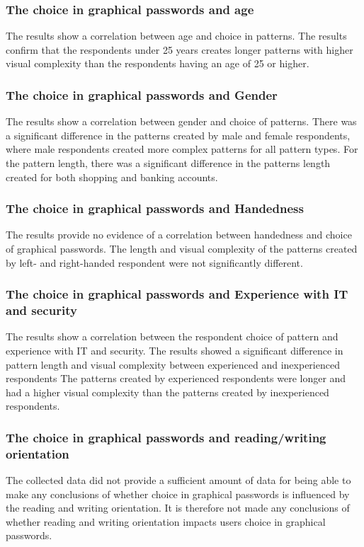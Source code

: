 \subsubsection*{The choice in graphical passwords and age}
The results show a correlation between age and choice in patterns. The results confirm that the respondents under 25 years creates longer patterns with higher visual complexity than the respondents having an age of 25 or higher. 

\subsubsection*{The choice in graphical passwords and Gender}
The results show a correlation between gender and choice of patterns. There was a significant difference in the patterns created by male and female respondents, where male respondents created more complex patterns for all pattern types. For the pattern length, there was a significant difference in the patterns length created for both shopping and banking accounts. 

\subsubsection*{The choice in graphical passwords and Handedness}
The results provide no evidence of a correlation between handedness and choice of graphical passwords. The length and visual complexity of the patterns created by left- and right-handed respondent were not significantly different. 

\subsubsection*{The choice in graphical passwords and Experience with IT and security}
The results show a correlation between the respondent choice of pattern and experience with IT and security. The results showed a significant difference in pattern length and visual complexity between experienced and inexperienced respondents The patterns created by experienced respondents were longer and had a higher visual complexity than the patterns created by inexperienced respondents.

\subsubsection*{The choice in graphical passwords and reading/writing orientation}
The collected data did not provide a sufficient amount of data for being able to make any conclusions of whether choice in graphical passwords is influenced by the reading and writing orientation. It is therefore not made any conclusions of whether reading and writing orientation impacts users choice in graphical passwords.


